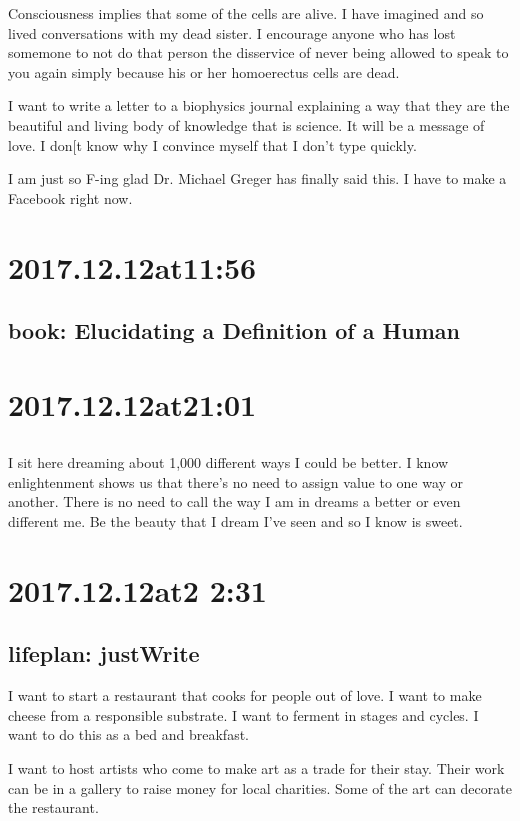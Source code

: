 \begin{enumerate}
\begin{enumerate}
Consciousness implies that some of the cells are alive. I have imagined and so lived conversations with my dead sister. I encourage anyone who has lost somemone to not do that person the disservice of never being allowed to speak to you again simply because his or her homoerectus cells are dead.

I want to write a letter to a biophysics journal explaining a way that they are the beautiful and living body of knowledge that is science. It will be a message of love. I don[t know why I convince myself that I don't type quickly.

I am just so F-ing glad Dr. Michael Greger has finally said this. I have to make a Facebook right now.

\section*{ 2017.12.12at11:56 }
\subsection*{ book: Elucidating a Definition of a Human }

\section*{ 2017.12.12at21:01 }
\subsection*{  }
I sit here dreaming about 1,000 different ways I could be better. I know enlightenment shows us that there's no need to assign value to one way or another. There is no need to call the way I am in dreams a better or even different me. Be the beauty that I dream I've seen and so I know is sweet.

\section*{ 2017.12.12at2 2:31 }
\subsection*{ lifeplan: justWrite }
I want to start a restaurant that cooks for people out of love. I want to make cheese from a responsible substrate. I want to ferment in stages and cycles. I want to do this as a bed and breakfast.

I want to host artists who come to make art as a trade for their stay. Their work can be in a gallery to raise money for local charities. Some of the art can decorate the restaurant.


\end{enumerate}
\end{enumerate}
